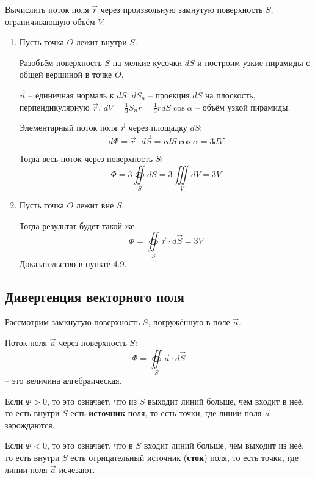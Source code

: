 	\begin{example}
	Вычислить поток поля \( \vec{r} \) через произвольную замнутую поверхность \( S \), ограничивающую объём \( V \).
	\end{example}
	
	\begin{solution}
	\begin{enumerate}
	\item Пусть точка \( O \) лежит внутри \( S \).
	
	Разобъём поверхность \( S \) на мелкие кусочки \( dS \) и построим узкие пирамиды с общей вершиной в точке \( O \).
	
	\( \vec{n} \) -- единичная нормаль к \( dS \).
	\( dS_n \) -- проекция \( dS \) на плоскость, перпендикулярную \( \vec{r} \).
	\( dV = \frac{1}{3}S_nr = \frac{1}{3}rdS\cos\alpha \) -- объём узкой пирамиды.

	Элементарный поток поля \( \vec{r} \) через площадку \( dS \):
	\[ d\Phi = \vec{r}\cdot d\vec{S} = rdS\cos\alpha = 3dV \]
	
	Тогда весь поток через поверхность \( S \):
	\[ \Phi = 3\oiint\limits_S dS = 3\iiint\limits_V dV = 3V \]
	
	\item Пусть точка \( O \) лежит вне \( S \).
	
	Тогда результат будет такой же:
	\[ \Phi = \oiint\limits_S \vec{r}\cdot d\vec{S} = 3V \]
	 Доказательство в пункте 4.9.
	\end{enumerate}
	\end{solution}
	
\subsection{Дивергенция векторного поля}

	Рассмотрим замкнутую поверхность \( S \), погружённую в поле \( \vec{a} \).
	
	Поток поля \( \vec{a} \) через поверхность \( S \):
	\[ \Phi = \oiint\limits_S \vec{a}\cdot d\vec{S} \]
	-- это величина алгебраическая.
	
	Если \( \Phi > 0 \), то это означает, что из \( S \) выходит линий больше, чем входит в неё, то есть внутри \( S \) есть \textbf{источник} поля, то есть точки, где линии поля \( \vec{a} \) зарождаются.
	
	Если \( \Phi < 0 \), то это означает, что в \( S \) входит линий больше, чем выходит из неё, то есть внутри \( S \) есть отрицательный источник (\textbf{сток}) поля, то есть точки, где линии поля \( \vec{a} \) исчезают.

